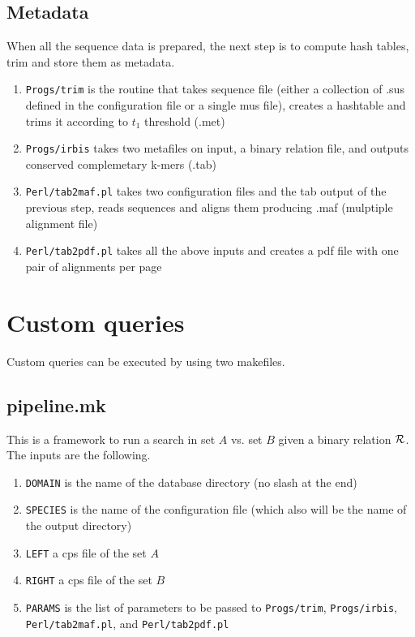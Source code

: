 \documentclass{article}
\begin{document}
\subsection{Metadata}
When all the sequence data is prepared, the next step is to compute hash tables, trim and store them as metadata.
\begin{enumerate}
\item {\tt Progs/trim} is the routine that takes sequence file (either a collection of .sus defined in the configuration file or a single mus file), 
creates a hashtable and trims it according to $t_1$ threshold (.met)
\item {\tt Progs/irbis} takes two metafiles on input, a binary relation file, and outputs conserved complemetary k-mers (.tab)
\item {\tt Perl/tab2maf.pl} takes two configuration files and the tab output of the previous step, reads sequences and aligns them producing .maf (mulptiple alignment file)
\item {\tt Perl/tab2pdf.pl} takes all the above inputs and creates a pdf file with one pair of alignments per page
\end{enumerate}

\section{Custom queries}
Custom queries can be executed by using two makefiles.
\subsection{pipeline.mk}
This is a framework to run a search in set $A$ vs. set $B$ given a binary relation ${\cal R}$. The inputs are the following.
\begin{enumerate}
\item {\tt DOMAIN} is the name of the database directory (no slash at the end)
\item {\tt SPECIES} is the name of the configuration file (which also will be the name of the output directory)
\item {\tt LEFT}  a cps file of the set $A$
\item {\tt RIGHT} a cps file of the set $B$
\item {\tt PARAMS} is the list of parameters to be passed to {\tt Progs/trim}, {\tt Progs/irbis}, {\tt Perl/tab2maf.pl}, and {\tt Perl/tab2pdf.pl}
\end{enumerate}
\end{document}
